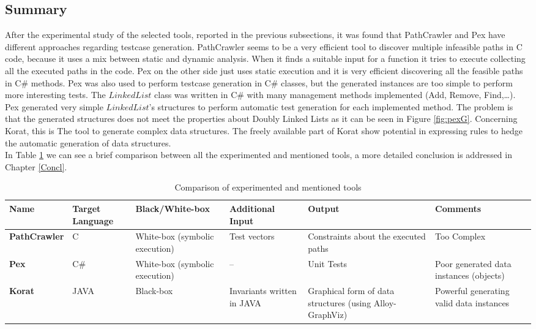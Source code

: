 \documentclass[a4paper,UKenglish]{oasics}
\begin{document}
\subsection{Summary}
After the experimental study of the selected tools, reported in the previous subsections, it was found that PathCrawler and Pex have different
approaches regarding testcase generation. PathCrawler seems to be a very efficient tool to discover multiple
infeasible paths in C code, because it uses a mix between static and dynamic analysis. When it finds a suitable input for a function it tries to execute
collecting all the executed paths in the code.
Pex on the other side just uses static execution and it is very efficient discovering all the feasible paths in C\# methods. Pex was also used
to perform testcase generation in C\# classes, but the generated instances are too simple to perform more interesting tests. The $LinkedList$ class was written
in C\# with many management methods implemented (Add, Remove, Find,\ldots). Pex generated very simple $LinkedList$'s structures to perform automatic test generation
for each implemented method. The problem is that the generated structures does not meet the properties about Doubly Linked Lists as it can be seen in Figure \ref{fig:pexG}.
Concerning Korat, this is The tool to generate complex data structures. The freely available part of Korat show potential in expressing rules to hedge
the automatic generation of data structures.\\
In Table \ref{tab:tabcmp} we can see a brief comparison between all the experimented and mentioned tools, a more detailed conclusion is addressed in Chapter \ref{Concl}.

\begin{table}[!ht]
\centering
\begin{tabular}{|m{2cm}|m{2cm}|m{2cm}|m{2cm}|m{2cm}|m{2cm}|}\hline
Name & Target Language & Black/White-box & Additional Input & Output & Comments\\\hline
\textbf{PathCrawler} & C & White-box (symbolic execution) & Test vectors & Constraints about the executed paths & Too Complex\\\hline
\textbf{Pex} & C\# & White-box (symbolic execution) & -- & Unit Tests & Poor generated data instances (objects)\\\hline
\textbf{Korat} & JAVA & Black-box & Invariants written in JAVA & Graphical form of data structures (using Alloy-GraphViz) & Powerful generating valid data instances\\\hline
\end{tabular}
\caption{Comparison of experimented and mentioned tools}
\label{tab:tabcmp}
\end{table}
\end{document}
